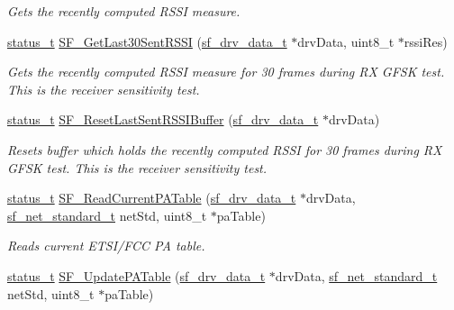 \begin{DoxyCompactItemize}
\begin{DoxyCompactList}\small\item\em Gets the recently computed R\+S\+SI measure. \end{DoxyCompactList}\item 
\mbox{\hyperlink{group__ksdk__common_gaaabdaf7ee58ca7269bd4bf24efcde092}{status\+\_\+t}} \mbox{\hyperlink{group__sf__functions__group_ga3f0b30bc3200751a313d6a8366048d44}{S\+F\+\_\+\+Get\+Last30\+Sent\+R\+S\+SI}} (\mbox{\hyperlink{structsf__drv__data__t}{sf\+\_\+drv\+\_\+data\+\_\+t}} $\ast$drv\+Data, uint8\+\_\+t $\ast$rssi\+Res)
\begin{DoxyCompactList}\small\item\em Gets the recently computed R\+S\+SI measure for 30 frames during RX G\+F\+SK test. This is the receiver sensitivity test. \end{DoxyCompactList}\item 
\mbox{\hyperlink{group__ksdk__common_gaaabdaf7ee58ca7269bd4bf24efcde092}{status\+\_\+t}} \mbox{\hyperlink{group__sf__functions__group_ga9d1a55dfe0f253669bc615cff200d609}{S\+F\+\_\+\+Reset\+Last\+Sent\+R\+S\+S\+I\+Buffer}} (\mbox{\hyperlink{structsf__drv__data__t}{sf\+\_\+drv\+\_\+data\+\_\+t}} $\ast$drv\+Data)
\begin{DoxyCompactList}\small\item\em Resets buffer which holds the recently computed R\+S\+SI for 30 frames during RX G\+F\+SK test. This is the receiver sensitivity test. \end{DoxyCompactList}\item 
\mbox{\hyperlink{group__ksdk__common_gaaabdaf7ee58ca7269bd4bf24efcde092}{status\+\_\+t}} \mbox{\hyperlink{group__sf__functions__group_gabd12f973d453b94074af729e5cb9f1c6}{S\+F\+\_\+\+Read\+Current\+P\+A\+Table}} (\mbox{\hyperlink{structsf__drv__data__t}{sf\+\_\+drv\+\_\+data\+\_\+t}} $\ast$drv\+Data, \mbox{\hyperlink{group__sf__enum__group_ga9ad07e4b666d7d70f7a69614ecb89421}{sf\+\_\+net\+\_\+standard\+\_\+t}} net\+Std, uint8\+\_\+t $\ast$pa\+Table)
\begin{DoxyCompactList}\small\item\em Reads current E\+T\+S\+I/\+F\+CC PA table. \end{DoxyCompactList}\item 
\mbox{\hyperlink{group__ksdk__common_gaaabdaf7ee58ca7269bd4bf24efcde092}{status\+\_\+t}} \mbox{\hyperlink{group__sf__functions__group_gac338c18f67a2ecbf5f2ce3a266b7292d}{S\+F\+\_\+\+Update\+P\+A\+Table}} (\mbox{\hyperlink{structsf__drv__data__t}{sf\+\_\+drv\+\_\+data\+\_\+t}} $\ast$drv\+Data, \mbox{\hyperlink{group__sf__enum__group_ga9ad07e4b666d7d70f7a69614ecb89421}{sf\+\_\+net\+\_\+standard\+\_\+t}} net\+Std, uint8\+\_\+t $\ast$pa\+Table)

\end{DoxyCompactItemize}
